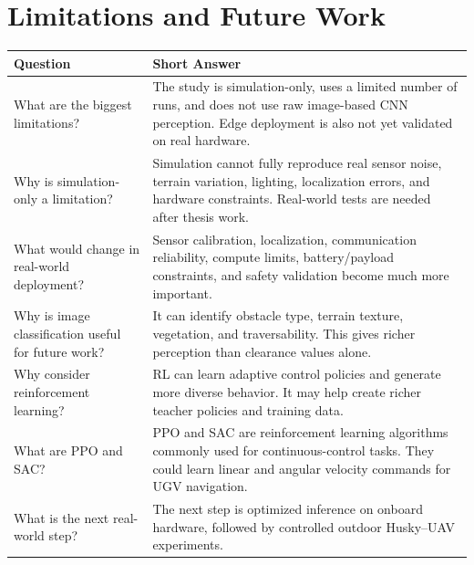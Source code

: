 \documentclass[11pt,a4paper]{article}
\begin{document}
\section*{Limitations and Future Work}
\begin{longtable}{QA}
\toprule
\textbf{Question} & \textbf{Short Answer} \\
\midrule
\endhead
What are the biggest limitations? &
The study is simulation-only, uses a limited number of runs, and does not use raw image-based CNN perception. Edge deployment is also not yet validated on real hardware. \\
\addlinespace
Why is simulation-only a limitation? &
Simulation cannot fully reproduce real sensor noise, terrain variation, lighting, localization errors, and hardware constraints. Real-world tests are needed after thesis work. \\
\addlinespace
What would change in real-world deployment? &
Sensor calibration, localization, communication reliability, compute limits, battery/payload constraints, and safety validation become much more important. \\
\addlinespace
Why is image classification useful for future work? &
It can identify obstacle type, terrain texture, vegetation, and traversability. This gives richer perception than clearance values alone. \\
\addlinespace
Why consider reinforcement learning? &
RL can learn adaptive control policies and generate more diverse behavior. It may help create richer teacher policies and training data. \\
\addlinespace
What are PPO and SAC? &
PPO and SAC are reinforcement learning algorithms commonly used for continuous-control tasks. They could learn linear and angular velocity commands for UGV navigation. \\
\addlinespace
What is the next real-world step? &
The next step is optimized inference on onboard hardware, followed by controlled outdoor Husky--UAV experiments. \\
\bottomrule
\end{longtable}
\end{document}
